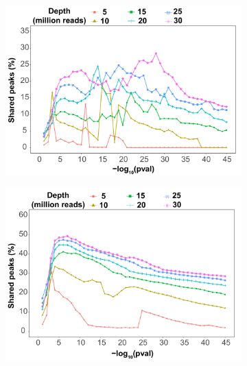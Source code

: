 \begin{figure}[htbp]
\centering
\begin{subfigure}{0.45\textwidth}
\centering
\includegraphics[width=\textwidth]{./Results1/pdfs/ATAC_Core_fresh_CTL2_CD4_shared_peaks_IDR_vs_pval}
\caption{\textbf{}}
\end{subfigure}%
\begin{subfigure}{0.45\textwidth}
\centering
\includegraphics[width=\textwidth]{./Results1/pdfs/ATAC_Core_fresh_CTL2_CD14_shared_peaks_IDR_vs_pval}
\caption{\textbf{}}
\end{subfigure} \\
\begin{subfigure}{0.65\textwidth}
\centering

\end{subfigure}
\end{figure}
